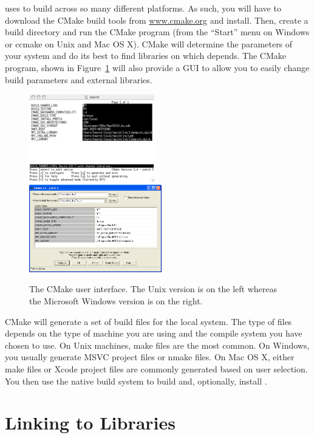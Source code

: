 \IceT uses  to build across so many different
platforms.  As such, you will have to download the CMake build tools from
\href{www.cmake.org}{www.cmake.org} and install.  Then, create a build
directory and run the CMake program (from the ``Start'' menu on Windows or
ccmake on Unix and Mac OS X).  CMake will determine the parameters of your
system and do its best to find libraries on which \IceT depends.  The CMake
program, shown in Figure~\ref{fig:Tutorial:ccmake} will also provide a GUI
to allow you to easily change build parameters and external libraries.
\begin{figure}
  \centering
  \includegraphics[height=1.5in]{images/ccmakeUnix}
  \qquad
  \includegraphics[height=1.5in]{images/ccmakeWindows}
  \caption[CMake user interface.]{The CMake user interface.  The Unix
    version is on the left whereas the Microsoft Windows version is on the
    right.}
  \label{fig:Tutorial:ccmake}
\end{figure}

CMake will generate a set of build files for the local system.  The type of
files depends on the type of machine you are using and the compile system
you have chosen to use.  On Unix machines, make files are the most common.
On Windows, you usually generate MSVC project files or nmake files.  On Mac
OS X, either make files or Xcode project files are commonly generated based
on user selection.  You then use the native build system to build and,
optionally, install \IceT.

\section{Linking to \IceT Libraries}
\label{sec:Tutorial:Linking_to_IceT_Libraries}


